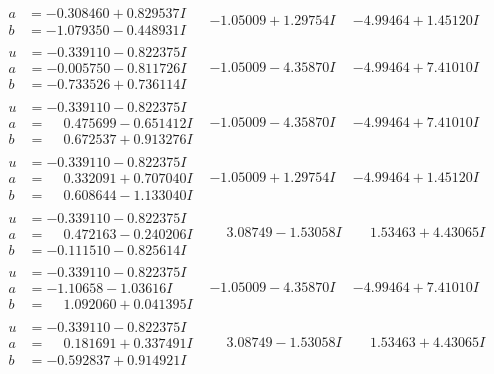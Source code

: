 \documentclass[1p]{elsarticle_modified}
\theoremstyle{definition}
\begin{document}
$$\begin{array}{c|c|c}
\begin{aligned}
a &= -0.308460 + 0.829537 I \\
b &= -1.079350 - 0.448931 I\end{aligned}
 & -1.05009 + 1.29754 I & -4.99464 + 1.45120 I \\ \hline\begin{aligned}
u &= -0.339110 - 0.822375 I \\
a &= -0.005750 - 0.811726 I \\
b &= -0.733526 + 0.736114 I\end{aligned}
 & -1.05009 - 4.35870 I & -4.99464 + 7.41010 I \\ \hline\begin{aligned}
u &= -0.339110 - 0.822375 I \\
a &= \phantom{-}0.475699 - 0.651412 I \\
b &= \phantom{-}0.672537 + 0.913276 I\end{aligned}
 & -1.05009 - 4.35870 I & -4.99464 + 7.41010 I \\ \hline\begin{aligned}
u &= -0.339110 - 0.822375 I \\
a &= \phantom{-}0.332091 + 0.707040 I \\
b &= \phantom{-}0.608644 - 1.133040 I\end{aligned}
 & -1.05009 + 1.29754 I & -4.99464 + 1.45120 I \\ \hline\begin{aligned}
u &= -0.339110 - 0.822375 I \\
a &= \phantom{-}0.472163 - 0.240206 I \\
b &= -0.111510 - 0.825614 I\end{aligned}
 & \phantom{-}3.08749 - 1.53058 I & \phantom{-}1.53463 + 4.43065 I \\ \hline\begin{aligned}
u &= -0.339110 - 0.822375 I \\
a &= -1.10658 - 1.03616 I \\
b &= \phantom{-}1.092060 + 0.041395 I\end{aligned}
 & -1.05009 - 4.35870 I & -4.99464 + 7.41010 I \\ \hline\begin{aligned}
u &= -0.339110 - 0.822375 I \\
a &= \phantom{-}0.181691 + 0.337491 I \\
b &= -0.592837 + 0.914921 I\end{aligned}
 & \phantom{-}3.08749 - 1.53058 I & \phantom{-}1.53463 + 4.43065 I \\ \hline\begin{aligned}

\end{aligned}
\end{array}$$
\end{document}
